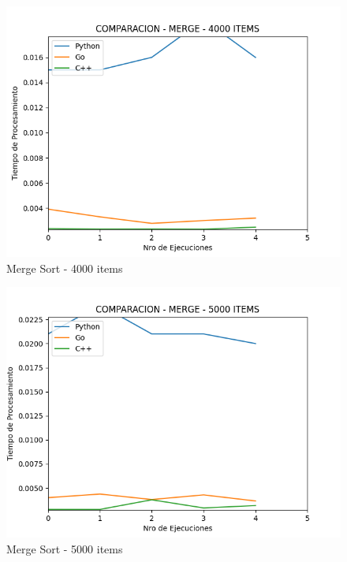 \documentclass[12pt]{article} %
\begin{document}
    \begin{figure}[H]
    \centering
    \includegraphics[width=\textwidth]{merge_4000}
    \caption{Merge Sort - 4000 items}
    \end{figure}

    \vspace{5mm}
    
    \begin{figure}[H]
    \centering
    \includegraphics[width=\textwidth]{merge_5000}
    \caption{Merge Sort - 5000 items}
    \end{figure}

    \vspace{5mm}
    
\end{document}
